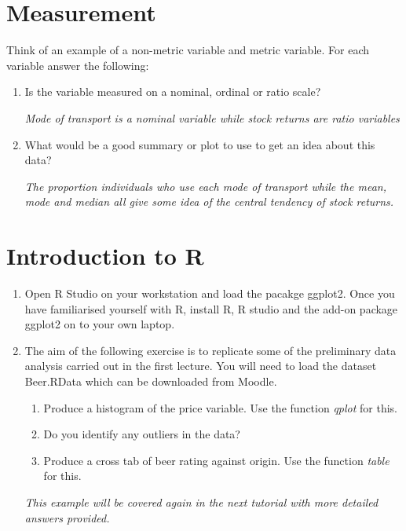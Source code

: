 \documentclass{article}
\begin{document}
\section{Measurement}
Think of an example of a non-metric variable and
metric variable.  For each variable answer the following:
\begin{enumerate}
	\item Is the variable measured on a	nominal, ordinal or ratio scale?
	
	{\em Mode of transport is a nominal variable while stock returns are ratio variables}
    
    \item What would be a good summary or plot to use to get an idea about this data?
    
    {\em The proportion individuals who use each mode of transport while the mean, mode and median all give
    some idea of the central tendency of stock returns.}
\end{enumerate}
\section{Introduction to R}
\begin{enumerate}
	\item Open R Studio on your workstation and load the pacakge ggplot2.  Once you have familiarised yourself with R, install R, R studio and the add-on package ggplot2 on to your own laptop.
	\item The aim of the following exercise is to replicate some of the preliminary data analysis carried out in the first lecture.  You will need to load the dataset Beer.RData which can be downloaded from Moodle.
    \begin{enumerate}
    \item Produce a histogram of the price  variable.  Use the function {\em qplot} for this.
    \item Do you identify any outliers in the data?
    \item Produce a cross tab of beer rating against origin.  Use the function {\em table} for this.
    \end{enumerate}
    {\em This example will be covered again in the next tutorial with more detailed answers provided.}
\end{enumerate}
\end{document}
